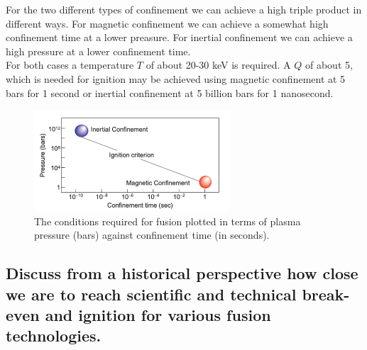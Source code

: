 \begin{multisolutionblock}
For the two different types of confinement we can achieve a high triple product in different ways. For magnetic confinement we can achieve a somewhat high confinement time at a lower preasure. For inertial confinement we can achieve a high pressure at a lower confinement time.\\
For both cases a temperature $T$ of about 20-30 keV is required. A $Q$ of about 5, which is needed for ignition may be achieved using magnetic confinement at 5 bars for 1 second or inertial confinement at 5 billion bars for 1 nanosecond.\\
\begin{figure}[H]
    \centering
    \includegraphics[width=0.65\textwidth]{chapters/fig/4_inertial_vs_magnetic.png}
    \caption{The conditions required for fusion plotted in terms of plasma pressure (bars) against confinement time (in seconds).}
    \label{fig:4_inertial_vs_magnetic}
\end{figure}
\end{multisolutionblock}

\subsection{Discuss from a historical perspective how close we are to reach scientific and technical break-even and ignition for various fusion technologies.}
